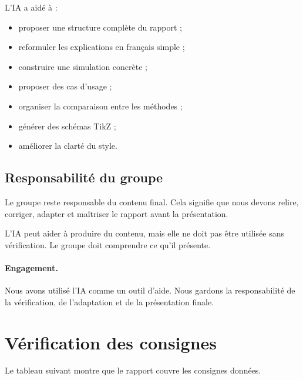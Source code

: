\documentclass[12pt,a4paper]{article}
\begin{document}
L'IA a aidé à :

\begin{itemize}
    \item proposer une structure complète du rapport ;
    \item reformuler les explications en français simple ;
    \item construire une simulation concrète ;
    \item proposer des cas d'usage ;
    \item organiser la comparaison entre les méthodes ;
    \item générer des schémas TikZ ;
    \item améliorer la clarté du style.
\end{itemize}

\subsection{Responsabilité du groupe}

Le groupe reste responsable du contenu final. Cela signifie que nous devons relire, corriger, adapter et maîtriser le rapport avant la présentation.

L'IA peut aider à produire du contenu, mais elle ne doit pas être utilisée sans vérification. Le groupe doit comprendre ce qu'il présente.

\paragraph{Engagement.}
Nous avons utilisé l'IA comme un outil d'aide. Nous gardons la responsabilité de la vérification, de l'adaptation et de la présentation finale.

\section{Vérification des consignes}

Le tableau suivant montre que le rapport couvre les consignes données.
\end{document}
